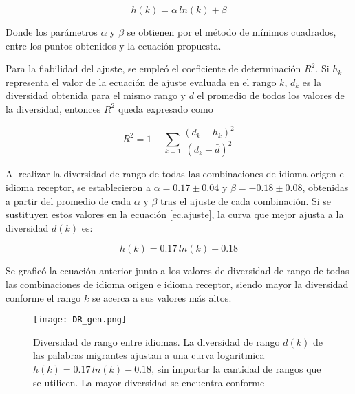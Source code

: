 \begin{equation}
\label{ec.ajuste}
h(k) =  \alpha \, ln(k) + \beta
\end{equation}

Donde los parámetros $\alpha$ y $\beta$  se  obtienen por el método de mínimos cuadrados, entre los puntos obtenidos y la ecuación propuesta.  



Para la fiabilidad del ajuste, se empleó el coeficiente de determinación $R^{2}$. Si $h_{k}$  representa el  valor de la ecuación de ajuste evaluada en el rango $k$,  $d_{k}$ es la diversidad obtenida para el mismo rango y $\bar{d}$ el promedio de todos los valores de la diversidad, entonces $R^{2}$ queda expresado como

\begin{equation}
\label{ec.r2_diversidad}
R^{2} = 1 - \sum_{k = 1} \frac{ \left( d_{k} - h_{k} \right)^{2}  }{ \left( d_{k} - \bar{d} \right)^{2} }	
\end{equation}

Al realizar la diversidad de rango de todas las combinaciones de idioma origen e idioma receptor,  se establecieron a $\alpha = 0.17\pm 0.04$ y $\beta = -0.18 \pm 0.08$, obtenidas a partir del promedio de cada $\alpha$ y $\beta$ tras el ajuste de cada combinación.  Si se sustituyen estos valores en la ecuación \ref{ec.ajuste}, la curva que mejor ajusta a la diversidad $d(k)$ es:


\begin{equation}
\label{ec.gen_ajs}
h(k) = 0.17\,ln(k) - 0.18
\end{equation} 

Se graficó la ecuación anterior junto a los valores de diversidad de rango de todas las combinaciones de idioma origen e idioma receptor, siendo mayor la diversidad conforme el rango $k$ se acerca a sus valores más altos.

\clearpage

\begin{figure}[h!]
	\centering
	\texttt{[image: DR\_gen.png]}
	\label{fig.DR_gen}
	\caption{Diversidad de rango entre idiomas. La diversidad de rango $d(k)$ de las palabras migrantes ajustan a una curva logaritmica $h(k) = 0.17\,ln(k) - 0.18$, sin importar la cantidad de rangos que se utilicen. La mayor diversidad se encuentra conforme }
\end{figure}



